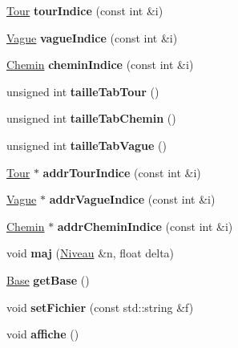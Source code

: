 \begin{DoxyCompactItemize}
\hyperlink{classTour}{Tour} {\bfseries tour\+Indice} (const int \&i)
\item 
\mbox{\label{classCarte_a042044f8d54a0f85953a5f61a0d38c86}} 
\hyperlink{classVague}{Vague} {\bfseries vague\+Indice} (const int \&i)
\item 
\mbox{\label{classCarte_aaab8126dc81caed5a8e38772d84b60e4}} 
\hyperlink{classChemin}{Chemin} {\bfseries chemin\+Indice} (const int \&i)
\item 
\mbox{\label{classCarte_a34264cb9ab59c19b9bd7ad1eeae324b0}} 
unsigned int {\bfseries taille\+Tab\+Tour} ()
\item 
\mbox{\label{classCarte_aa55a81ad0d51af69b0a34dcc544b678d}} 
unsigned int {\bfseries taille\+Tab\+Chemin} ()
\item 
\mbox{\label{classCarte_a17cf9a92bb7d81cf3279b50bb40b0891}} 
unsigned int {\bfseries taille\+Tab\+Vague} ()
\item 
\mbox{\label{classCarte_a573a9aa2b9917152357b710fe0be6ecc}} 
\hyperlink{classTour}{Tour} $\ast$ {\bfseries addr\+Tour\+Indice} (const int \&i)
\item 
\mbox{\label{classCarte_a21708cf932e4d0e74ed0222f7950582a}} 
\hyperlink{classVague}{Vague} $\ast$ {\bfseries addr\+Vague\+Indice} (const int \&i)
\item 
\mbox{\label{classCarte_a16a507cb5eb10f57f0d34052db75689c}} 
\hyperlink{classChemin}{Chemin} $\ast$ {\bfseries addr\+Chemin\+Indice} (const int \&i)
\item 
\mbox{\label{classCarte_a6d721dfc81b3a45f038c73d20e80d545}} 
void {\bfseries maj} (\hyperlink{classNiveau}{Niveau} \&n, float delta)
\item 
\mbox{\label{classCarte_af76239ad9a307cf94ba0916ea477a331}} 
\hyperlink{classBase}{Base} {\bfseries get\+Base} ()
\item 
\mbox{\label{classCarte_a66c41e01a4a8730630bd77b6dd1b670e}} 
void {\bfseries set\+Fichier} (const std\+::string \&f)
\item 
\mbox{\label{classCarte_aef8696f9e6017496583bf32fb7cceb80}} 
void {\bfseries affiche} ()
\end{DoxyCompactItemize}


